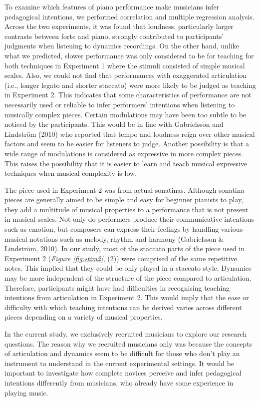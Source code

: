 \documentclass[
  man,floatsintext]{apa6}
\begin{document}
To examine which features of piano performance make musicians infer pedagogical intentions, we performed correlation and multiple regression analysis. Across the two experiments, it was found that loudness, particularly larger contrasts between forte and piano, strongly contributed to participants' judgments when listening to dynamics recordings. On the other hand, unlike what we predicted, slower performance was only considered to be for teaching for both techniques in Experiment 1 where the stimuli consisted of simple musical scales. Also, we could not find that performances with exaggerated articulation (i.e., longer legato and shorter staccato) were more likely to be judged as teaching in Experiment 2. This indicates that some characteristics of performance are not necessarily used or reliable to infer performers' intentions when listening to musically complex pieces. Certain modulations may have been too subtle to be noticed by the participants. This would be in line with Gabrielsson and Lindström (2010) who reported that tempo and loudness reign over other musical factors and seem to be easier for listeners to judge. Another possibility is that a wide range of modulations is considered as expressive in more complex pieces. This raises the possibility that it is easier to learn and teach musical expressive techniques when musical complexity is low.

The piece used in Experiment 2 was from actual sonatinas. Although sonatina pieces are generally aimed to be simple and easy for beginner pianists to play, they add a multitude of musical properties to a performance that is not present in musical scales. Not only do performers produce their communicative intentions such as emotion, but composers can express their feelings by handling various musical notations such as melody, rhythm and harmony (Gabrielsson \& Lindström, 2010). In our study, most of the staccato parts of the piece used in Experiment 2 (\emph{Figure \ref{fig:stim2}}, (2)) were comprised of the same repetitive notes. This implied that they could be only played in a staccato style. Dynamics may be more independent of the structure of the piece compared to articulation. Therefore, participants might have had difficulties in recognising teaching intentions from articulation in Experiment 2. This would imply that the ease or difficulty with which teaching intentions can be derived varies across different pieces depending on a variety of musical properties.

In the current study, we exclusively recruited musicians to explore our research questions. The reason why we recruited musicians only was because the concepts of articulation and dynamics seem to be difficult for those who don't play an instrument to understand in the current experimental settings. It would be important to investigate how complete novices perceive and infer pedagogical intentions differently from musicians, who already have some experience in playing music.
\end{document}

